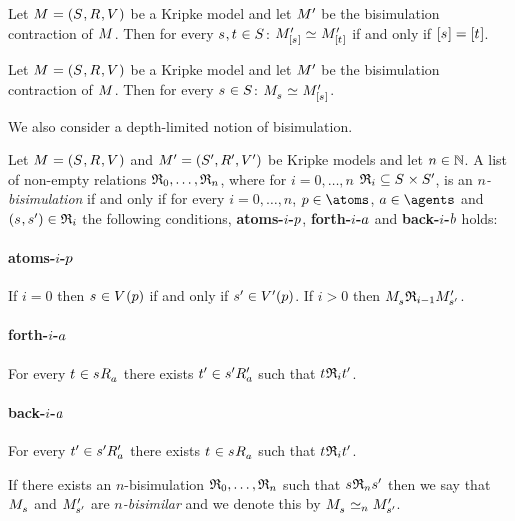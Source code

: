 \begin{proposition}
Let $\kModelAndTuple$ be a Kripke model and let ${M^{\prime}_{}}$ be the bisimulation contraction of $\kModel$.
Then for every $\kStateS, \kStateT \in \kStates$: $\kPModelP{[\kStateS]} \bisimilar \kPModelP{[\kStateT]}$ if and only if $[\kStateS] = [\kStateT]$.
\end{proposition}

\begin{proposition}
Let $\kModelAndTuple$ be a Kripke model and let ${M^{\prime}_{}}$ be the bisimulation contraction of $\kModel$.
Then for every $\kStateS \in \kStates$: $\kPModel{\kStateS} \bisimilar \kPModelP{[\kStateS]}$.
\end{proposition}

We also consider a depth-limited notion of bisimulation.

\begin{definition}[$n$-bisimulation]
Let $\kModelAndTuple$ and $\kModelAndTupleP$ be Kripke models and let $n \in \mathbb{N}$.
A list of non-empty relations $\mathfrak{R}_0, \dots, \mathfrak{R}_n$, where for $i = 0, \dots, n$ $\bisimulation_i \subseteq \kStates \times \kStatesP$, is an {\em $n$-bisimulation} if and only if for every $i = 0, \dots, n$, $\atomP \in \atoms$, $\agentA \in \agents$ and $(\kStateS, \kStateSP) \in \bisimulation_i$ the following conditions, {\bf atoms-$i$-$p$}, {\bf forth-$i$-$a$} and {\bf back-$i$-$b$} holds:

\paragraph{atoms-$i$-$p$}
If $i = 0$ then $\kStateS \in \kValuation(\atomP)$ if and only if ${{s}^{\prime}} \in {V^{\prime}}(p)$.
If $i > 0$ then $\kPModel{\kStateS} \bisimulation_{i-1} \kPModelP{\kStateSP}$.

\paragraph{forth-$i$-$a$}
For every $\kStateT \in \kSuccessorsA{\kStateS}$ there exists ${{t}^{\prime}} \in {{{s}^{\prime}}} {R^{\prime}_{a}}$ such that $\kStateT \bisimulation_i \kStateTP$.

\paragraph{back-$i$-$a$}
For every ${{t}^{\prime}} \in {{{s}^{\prime}}} {R^{\prime}_{a}}$ there exists $\kStateT \in \kSuccessorsA{\kStateS}$ such that $\kStateT \bisimulation_i \kStateTP$.

If there exists an $n$-bisimulation $\mathfrak{R}_0, \dots, \mathfrak{R}_n$ such that $\kStateS \bisimulation_n \kStateSP$ then we say that $\kPModel{\kStateS}$ and ${M^{\prime}_{{{s}^{\prime}}}}$ are {\em $n$-bisimilar} and we denote this by $\kPModel{\kStateS} \bisimilar[n] \kPModelP{\kStateSP}$.
\end{definition}

